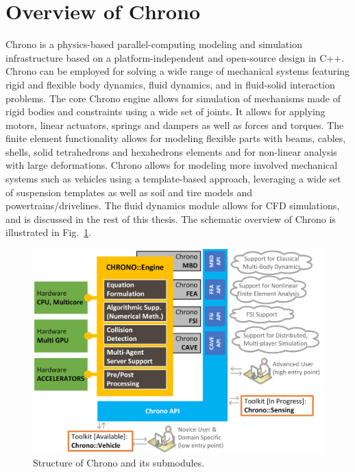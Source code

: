 \section{Overview of Chrono}
Chrono is a physics-based parallel-computing modeling and simulation infrastructure based on a platform-independent and open-source design in C++.  Chrono can be employed for solving a wide range of mechanical systems featuring rigid and flexible body dynamics, fluid dynamics, and in fluid-solid interaction problems. 
The core Chrono engine allows for simulation of mechanisms made of rigid bodies and constraints using a wide set of joints. It allows for applying motors, linear actuators, springs and dampers as well as forces and torques. The finite element functionality allows for modeling flexible parts with beams, cables, shells, solid tetrahedrons and hexahedrons elements and for non-linear analysis with large deformations. Chrono allows for modeling more involved mechanical systems such as vehicles using a template-based approach, leveraging a wide set of suspension templates as well as soil and tire models and powertrains/drivelines.
The fluid dynamics module allows for CFD simulations, and is discussed in the rest of this thesis. The schematic overview of Chrono is illustrated in Fig.~\ref{fig:chrono}.
\begin{figure}[H]
	\begin{center}
		\includegraphics[width=.9\linewidth]{images/chronoStructure.png}
	\end{center}
	\caption{Structure of Chrono and its submodules.}
	\label{fig:chrono}
\end{figure}


